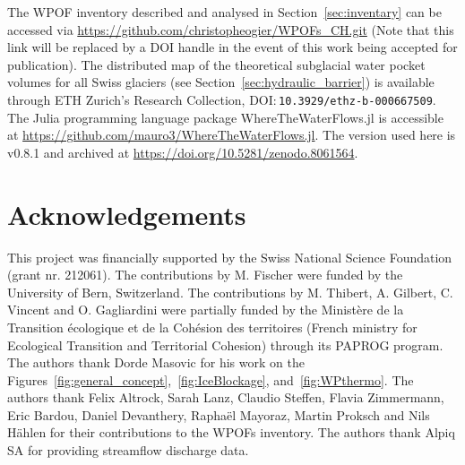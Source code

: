 The WPOF inventory described and analysed in Section~\ref{sec:inventary} can be accessed via \url{https://github.com/christopheogier/WPOFs_CH.git} (Note that this link will be replaced by a DOI handle in the event of this work being accepted for publication). The distributed map of the theoretical subglacial water pocket volumes for all Swiss glaciers (see Section~\ref{sec:hydraulic_barrier}) is available through ETH Zurich's Research Collection, DOI:\,\texttt{10.3929/ethz-b-000667509}. The Julia programming language package WhereTheWaterFlows.jl is accessible at \url{https://github.com/mauro3/WhereTheWaterFlows.jl}. The version used here is v0.8.1 and archived at \url{https://doi.org/10.5281/zenodo.8061564}.\\

\section{ Acknowledgements} 

This project was financially supported by the Swiss National Science Foundation (grant nr. 212061). The contributions by M. Fischer were funded by the University of Bern, Switzerland. The contributions by M. Thibert, A. Gilbert, C. Vincent and O. Gagliardini were partially funded by 
the Ministère de la Transition écologique et de la Cohésion des territoires (French ministry for Ecological Transition and Territorial Cohesion) through 
its PAPROG program. The authors thank Dorde Masovic for his work on the Figures~\ref{fig:general_concept},~\ref{fig:IceBlockage}, and~\ref{fig:WPthermo}. The authors thank Felix Altrock, Sarah Lanz, Claudio Steffen, Flavia Zimmermann, Eric Bardou, Daniel Devanthery, Raphaël Mayoraz, Martin Proksch and Nils Hählen for their contributions to the WPOFs inventory. The authors thank Alpiq SA for providing streamflow discharge data.




